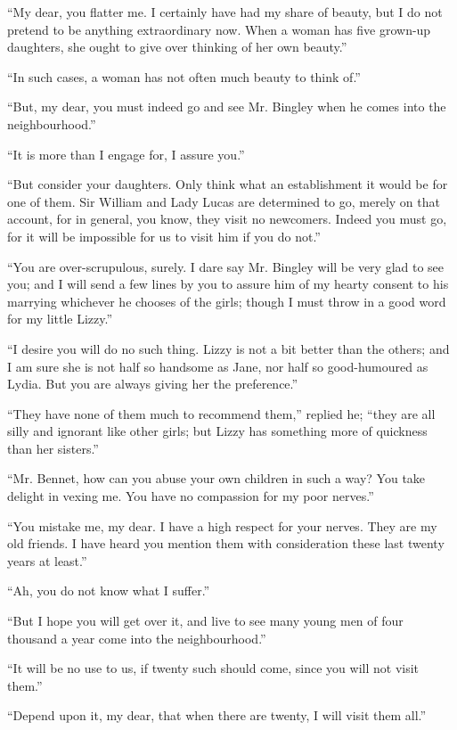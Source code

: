“My dear, you flatter me. I certainly have had my share of
beauty, but I do not pretend to be anything extraordinary now.
When a woman has five grown-up daughters, she ought to give over
thinking of her own beauty.”

“In such cases, a woman has not often much beauty to think of.”

“But, my dear, you must indeed go and see Mr. Bingley when he
comes into the neighbourhood.”

“It is more than I engage for, I assure you.”

“But consider your daughters. Only think what an establishment it
would be for one of them. Sir William and Lady Lucas are
determined to go, merely on that account, for in general, you
know, they visit no newcomers. Indeed you must go, for it will be
impossible for us to visit him if you do not.”

“You are over-scrupulous, surely. I dare say Mr. Bingley will be
very glad to see you; and I will send a few lines by you to
assure him of my hearty consent to his marrying whichever he
chooses of the girls; though I must throw in a good word for my
little Lizzy.”

“I desire you will do no such thing. Lizzy is not a bit better
than the others; and I am sure she is not half so handsome as
Jane, nor half so good-humoured as Lydia. But you are always
giving her the preference.”

“They have none of them much to recommend them,” replied he;
“they are all silly and ignorant like other girls; but Lizzy has
something more of quickness than her sisters.”

“Mr. Bennet, how can you abuse your own children in such a way?
You take delight in vexing me. You have no compassion for my poor
nerves.”

“You mistake me, my dear. I have a high respect for your nerves.
They are my old friends. I have heard you mention them with
consideration these last twenty years at least.”

“Ah, you do not know what I suffer.”

“But I hope you will get over it, and live to see many young men
of four thousand a year come into the neighbourhood.”

“It will be no use to us, if twenty such should come, since you
will not visit them.”

“Depend upon it, my dear, that when there are twenty, I will
visit them all.”

